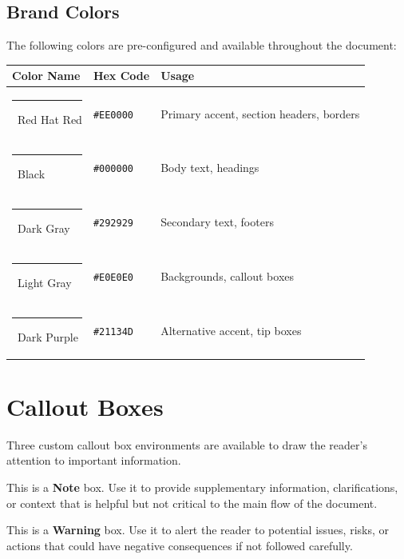 \documentclass[11pt,a4paper]{article}
\begin{document}
\subsection{Brand Colors}

The following colors are pre-configured and available throughout the document:

\begin{center}
\begin{tabularx}{\textwidth}{llX}
    \toprule
    \textbf{Color Name} & \textbf{Hex Code} & \textbf{Usage} \\
    \midrule
    \textcolor{RHRed}{\rule{1em}{1em}}~Red Hat Red    & \texttt{\#EE0000} & Primary accent, section headers, borders \\
    \textcolor{RHBlack}{\rule{1em}{1em}}~Black         & \texttt{\#000000} & Body text, headings \\
    \textcolor{RHDarkGray}{\rule{1em}{1em}}~Dark Gray  & \texttt{\#292929} & Secondary text, footers \\
    \textcolor{RHLightGray}{\rule{1em}{1em}}~Light Gray & \texttt{\#E0E0E0} & Backgrounds, callout boxes \\
    \textcolor{RHDarkPurple}{\rule{1em}{1em}}~Dark Purple & \texttt{\#21134D} & Alternative accent, tip boxes \\
    \bottomrule
\end{tabularx}
\end{center}

\section{Callout Boxes}

Three custom callout box environments are available to draw the reader's attention to important information.

\begin{rhnote}
This is a \textbf{Note} box. Use it to provide supplementary information, clarifications, or context that is helpful but not critical to the main flow of the document.
\end{rhnote}

\vspace{0.5em}

\begin{rhwarning}
This is a \textbf{Warning} box. Use it to alert the reader to potential issues, risks, or actions that could have negative consequences if not followed carefully.
\end{rhwarning}
\end{document}
